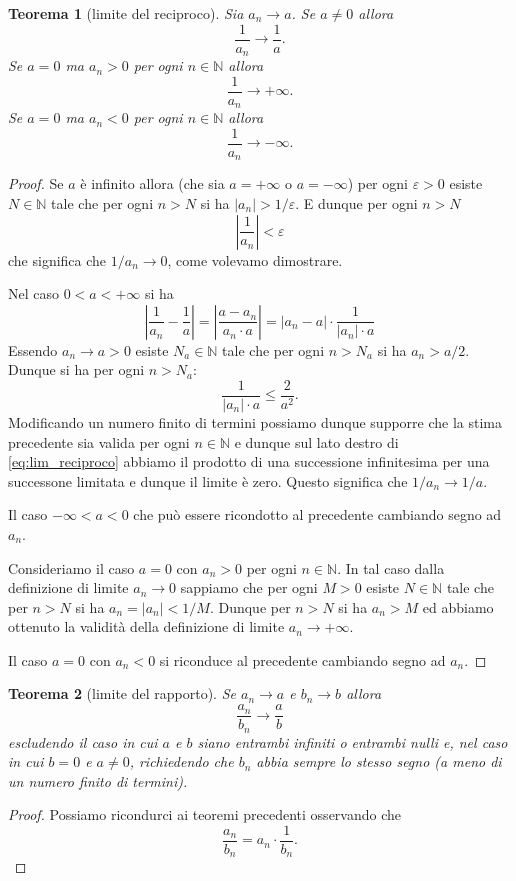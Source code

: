 \documentclass[italian,a4paper,oneside,headinclude]{scrbook}
\newcommand{\eps}{\varepsilon}
\newcommand{\NN}{\mathbb N}
\newcommand{\abs}[1]{{\left|#1\right|}}
\newtheorem{theorem}{Teorema}
\begin{document}
\begin{theorem}[limite del reciproco]
Sia $a_n \to a$.
Se $a\neq 0$ allora
\[
  \frac{1}{a_n} \to \frac{1}{a}.
\]
Se $a = 0$ ma $a_n>0$ per ogni $n\in \NN$ allora
\[
  \frac{1}{a_n} \to +\infty.
\]
Se $a=0$ ma $a_n<0$ per ogni $n\in \NN$ allora
\[
  \frac{1}{a_n} \to -\infty.
\]
\end{theorem}
%
\begin{proof}
Se $a$ è infinito allora
(che sia $a=+\infty$ o $a=-\infty$)
per ogni $\eps > 0$ esiste $N\in \NN$ tale che per ogni $n>N$ si ha
$\abs{a_n} > 1/\eps$. E dunque per ogni $n>N$
\[
\abs{\frac{1}{a_n}} < \eps
\]
che significa che $1/a_n \to 0$, come volevamo dimostrare.

Nel caso $0 < a < +\infty$ si ha
\begin{equation}\label{eq:lim_reciproco}
 \abs{\frac{1}{a_n} - \frac{1}{a}}
 = \abs{\frac{a - a_n}{a_n \cdot a}}
 = \abs{a_n -a} \cdot \frac{1}{\abs{a_n}\cdot a}
\end{equation}
Essendo $a_n \to a > 0$ esiste $N_a\in \NN$ tale
che per ogni $n>N_a$ si ha $a_n > a/2$. Dunque si ha
per ogni $n>N_a$:
\[
\frac{1}{\abs{a_n}\cdot a} \le \frac{2}{a^2}.
\]
Modificando un numero finito di termini possiamo dunque supporre
che la stima precedente sia valida per ogni $n\in \NN$
e dunque sul lato destro di \eqref{eq:lim_reciproco} abbiamo
il prodotto di una successione infinitesima per una successone limitata e dunque il limite è zero. Questo significa che $1/a_n \to 1/a$.

Il caso $-\infty < a < 0$ che può essere ricondotto al precedente cambiando segno ad $a_n$.

Consideriamo il caso $a=0$ con $a_n>0$ per ogni $n\in \NN$. In tal caso
dalla definizione di limite $a_n \to 0$ sappiamo che
per ogni $M>0$ esiste $N\in \NN$ tale che per $n>N$ si ha
$a_n = \abs{a_n} < 1/M$. Dunque per $n>N$ si ha $a_n > M$ ed
abbiamo ottenuto la validità della definizione di limite $a_n \to +\infty$.

Il caso $a=0$ con $a_n<0$ si riconduce al precedente cambiando
segno ad $a_n$.
\end{proof}

\begin{theorem}[limite del rapporto]
Se $a_n \to a$ e $b_n\to b$ allora
\[
  \frac{a_n}{b_n} \to \frac{a}{b}
\]
escludendo il caso in cui
$a$ e $b$ siano entrambi infiniti o entrambi nulli
e, nel caso in cui $b=0$ e $a\neq 0$, richiedendo che $b_n$
abbia sempre lo stesso segno (a meno di un numero finito di termini).
\end{theorem}
%
\begin{proof}
Possiamo ricondurci ai teoremi precedenti osservando che
\[
   \frac{a_n}{b_n} = a_n \cdot \frac{1}{b_n}.
\]
\end{proof}
\end{document}
